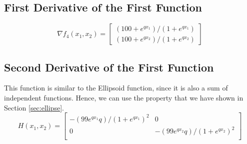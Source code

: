 \documentclass[a4paper]{article}
\begin{document}
\subsection{First Derivative of the First Function}
\[
\nabla f_4(x_1, x_2) = 
\begin{bmatrix}
  (100 + e^{q x_1})/(1 + e^{q x_1}) \\
  (100 + e^{q x_2})/(1 + e^{q x_2})
\end{bmatrix}
\]
\subsection{Second Derivative of the First Function}
This function is similar to the Ellipsoid function, since it is also a sum of
independent functions. Hence, we can use the property that we have shown in
Section \ref{sec:ellipse}.
\[
H(x_1,x_2) = 
\begin{bmatrix}
-(99 e^{q x_1} q)/(1 + e^{q x_1})^2 & 0 \\
0 & -(99 e^{q x_2} q)/(1 + e^{q x_2})^2 \\
\end{bmatrix}
\]
\end{document}

